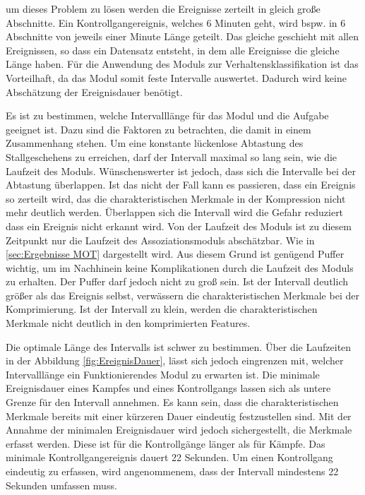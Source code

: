 um dieses Problem zu lösen werden die Ereignisse zerteilt in gleich große Abschnitte. Ein Kontrollgangereignis, welches 6 Minuten geht, wird bspw. in 6 Abschnitte von jeweils einer Minute Länge geteilt. Das gleiche geschieht mit allen Ereignissen, so dass ein Datensatz entsteht, in dem alle Ereignisse die gleiche Länge haben. Für die Anwendung des Moduls zur Verhaltensklassifikation ist das Vorteilhaft, da das Modul somit feste Intervalle auswertet. Dadurch wird keine Abschätzung der Ereignisdauer benötigt. \par

Es ist zu bestimmen, welche Intervalllänge für das Modul und die Aufgabe geeignet ist. Dazu sind die Faktoren zu betrachten, die damit in einem Zusammenhang stehen. Um eine konstante lückenlose Abtastung des Stallgeschehens zu erreichen, darf der Intervall maximal so lang sein, wie die Laufzeit des Moduls. Wünschenswerter ist jedoch, dass sich die Intervalle bei der Abtastung überlappen. Ist das nicht der Fall kann es passieren, dass ein Ereignis so zerteilt wird, das die charakteristischen Merkmale in der Kompression nicht mehr deutlich werden. Überlappen sich die Intervall wird die Gefahr reduziert dass ein Ereignis nicht erkannt wird. Von der Laufzeit des Moduls ist zu diesem Zeitpunkt nur die Laufzeit des Assoziationsmoduls abschätzbar. Wie in \ref{sec:Ergebnisse MOT} dargestellt wird. Aus diesem Grund ist genügend Puffer wichtig, um im Nachhinein keine Komplikationen durch die Laufzeit des Moduls zu erhalten. Der Puffer darf jedoch nicht zu groß sein. Ist der Intervall deutlich größer als das Ereignis selbst, verwässern die charakteristischen Merkmale bei der Komprimierung. Ist der Intervall zu klein, werden die charakteristischen Merkmale nicht deutlich in den komprimierten Features. \par

Die optimale Länge des Intervalls ist schwer zu bestimmen. Über die Laufzeiten in der Abbildung \ref{fig:EreignisDauer}, lässt sich jedoch eingrenzen mit, welcher Intervalllänge ein Funktionierendes Modul zu erwarten ist. Die minimale Ereignisdauer eines Kampfes und eines Kontrollgangs lassen sich als untere Grenze für den Intervall annehmen. Es kann sein, dass die charakteristischen Merkmale bereits mit einer kürzeren Dauer eindeutig festzustellen sind. Mit der Annahme der minimalen Ereignisdauer wird jedoch sichergestellt, die Merkmale erfasst werden. Diese ist für die Kontrollgänge länger als für Kämpfe. Das minimale Kontrollgangereignis dauert 22 Sekunden. Um einen Kontrollgang eindeutig zu erfassen, wird angenommenem, dass der Intervall mindestens 22 Sekunden umfassen muss. \par

